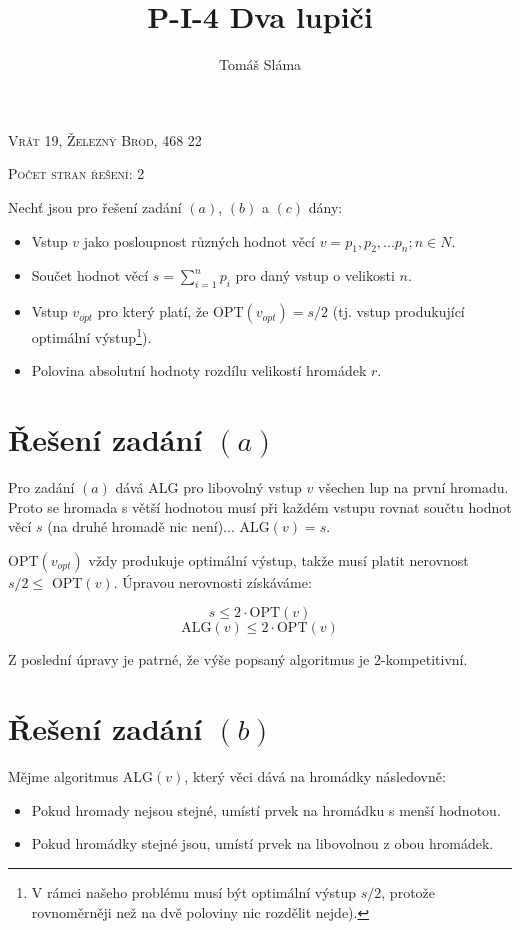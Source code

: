 \documentclass[a4paper, 12pt]{article}
\title{P-I-4 Dva lupiči}
\author{Tomáš Sláma}
\date{}
\begin{document}
  \maketitle

  \bigskip
  \begin{center}
    \textsc{Vrát 19, Železný Brod, 468 22}

    \textsc{Počet stran řešení: 2}
  \end{center}

  \newpage

  Nechť jsou pro řešení zadání $(a)$, $(b)$ a $(c)$ dány:
  \begin{itemize}
    \item Vstup $v$ jako posloupnost různých hodnot věcí $v=p_1, p_2,...p_n; n \in N$.
    \item Součet hodnot věcí $s=\sum\limits_{i=1}^n p_i$ pro daný vstup o velikosti $n$.
    \item Vstup $v_{opt}$ pro který platí, že OPT$(v_{opt})=s/2$ (tj. vstup produkující optimální výstup\footnote{V rámci našeho problému musí být optimální výstup $s/2$, protože rovnoměrněji než na dvě poloviny nic rozdělit nejde).}).
    \item Polovina absolutní hodnoty rozdílu velikostí hromádek $r$.
  \end{itemize}

  \section{Řešení zadání $(a)$}
  Pro zadání $(a)$ dává ALG pro libovolný vstup $v$ všechen lup na první hromadu. Proto se hromada s větší hodnotou musí při každém vstupu rovnat součtu hodnot věcí $s$ (na druhé hromadě nic není)... ALG$(v)=s$.

  OPT$(v_{opt})$ vždy produkuje optimální výstup, takže musí platit nerovnost $s/2 \le$ OPT$(v)$. Úpravou nerovnosti získáváme:

  $$s \le 2\cdot\text{OPT}(v)$$
  $$\text{ALG}(v) \le 2 \cdot\text{OPT}(v)$$

  Z poslední úpravy je patrné, že výše popsaný algoritmus je 2-kompetitivní.

  \section{Řešení zadání $(b)$}
  Mějme algoritmus ALG$(v)$, který věci dává na hromádky následovně:
  \begin{itemize}
    \item Pokud hromady nejsou stejné, umístí prvek na hromádku s menší hodnotou.
    \item Pokud hromádky stejné jsou, umístí prvek na libovolnou z obou hromádek.
  \end{itemize}
\end{document}
